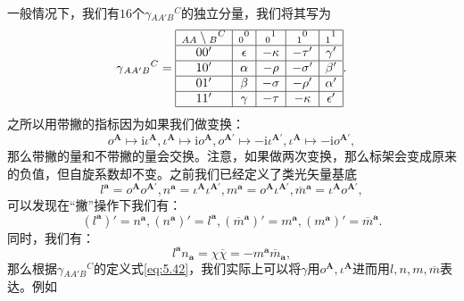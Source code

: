 一般情况下，我们有$16$个$\gamma {_{AA'B}}^{C}$的独立分量，我们将其写为
\begin{equation*}
	\gamma {_{AA'B}}^{C} =\begin{array}{|c|c|c|c|c|}
		\hline
		_{AA} \setminus {_{B}}^{C} & {_{0}}^{0} & {_{0}}^{1} & {_{1}}^{0} & {_{1}}^{1}\\
		\hline
		00' & \epsilon  & -\kappa  & -\tau ' & \gamma '\\
		\hline
		10' & \alpha  & -\rho  & -\sigma ' & \beta '\\
		\hline
		01' & \beta  & -\sigma  & -\rho ' & \alpha '\\
		\hline
		11' & \gamma  & -\tau  & -\kappa  & \epsilon '\\
		\hline
	\end{array} .
\end{equation*}
之所以用带撇的指标因为如果我们做变换：
\begin{equation*}
	o^{\boldsymbol{A}} \mapsto \mathrm{i} \iota ^{\boldsymbol{A}} ,\iota ^{\boldsymbol{A}} \mapsto \mathrm{i} o^{\boldsymbol{A}} ,o^{\boldsymbol{A} '} \mapsto -\mathrm{i} \iota ^{\boldsymbol{A} '} ,\iota ^{\boldsymbol{A}} \mapsto -\mathrm{i} o^{\boldsymbol{A} '} ,
\end{equation*}
那么带撇的量和不带撇的量会交换。注意，如果做两次变换，那么标架会变成原来的负值，但自旋系数却不变。之前我们已经定义了类光矢量基底
\begin{equation*}
	l^{\boldsymbol{a}} =o^{\boldsymbol{A}} o^{\boldsymbol{A} '} ,n^{\boldsymbol{a}} =\iota ^{\boldsymbol{A}} \iota ^{\boldsymbol{A} '} ,m^{\boldsymbol{a}} =o^{\boldsymbol{A}} \iota ^{\boldsymbol{A} '} ,\overline{m}^{\boldsymbol{a}} =\iota ^{\boldsymbol{A}} o^{\boldsymbol{A} '} ,
\end{equation*}
可以发现在“撇”操作下我们有：
\begin{equation*}
	(l^{\boldsymbol{a}} )'=n^{\boldsymbol{a}} ,(n^{\boldsymbol{a}} )'=l^{\boldsymbol{a}} ,(\overline{m}^{\boldsymbol{a}} )'=m^{\boldsymbol{a}} ,(m^{\boldsymbol{a}} )'=\overline{m}^{\boldsymbol{a}} .
\end{equation*}
同时，我们有：
\begin{equation}
	l^{\boldsymbol{a}} n_{\boldsymbol{a}} =\chi \overline{\chi } =-m^{\boldsymbol{a}}\overline{m}_{\boldsymbol{a}} ,
	\label{eq:5.45}
\end{equation}
那么根据$\gamma {_{AA'B}}^{C}$的定义式\ref{eq:5.42}，我们实际上可以将$\gamma $用$o^{\boldsymbol{A}} ,\iota ^{\boldsymbol{A}}$进而用$l,n,m,\overline{m}$表达。例如
